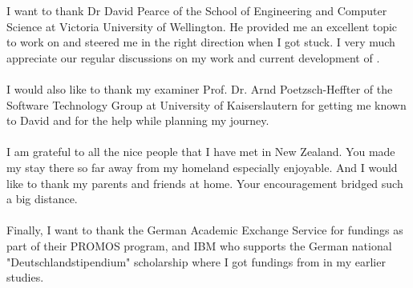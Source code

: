 I want to thank Dr David Pearce of the School of Engineering and Computer Science at Victoria University of Wellington.
He provided me an excellent topic to work on and steered me in the right direction when I got stuck.
I very much appreciate our regular discussions on my work and current development of \whiley.
\\\\
I would also like to thank my examiner Prof. Dr. Arnd Poetzsch-Heffter of the Software Technology Group at University of Kaiserslautern for getting me known to David and for the help while planning my journey.
\\\\
I am grateful to all the nice people that I have met in New Zealand.
You made my stay there so far away from my homeland especially enjoyable.
And I would like to thank my parents and friends at home.
Your encouragement bridged such a big distance.
\\\\
Finally, I want to thank the German Academic Exchange Service for fundings as part of their PROMOS program, and IBM who supports the German national "Deutschlandstipendium" scholarship where I got fundings from in my earlier studies.
